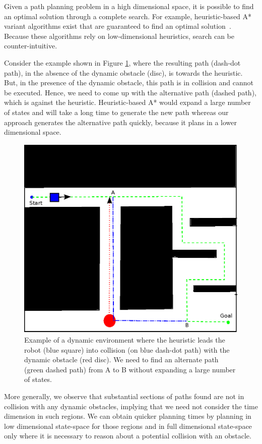 Given a path planning problem in a high dimensional space, it is possible to find an optimal solution through a complete search. For example, heuristic-based A* variant algorithms exist that are guaranteed to find an optimal solution~\cite{silver2005cooperative}. Because these algorithms rely on low-dimensional heuristics, search can be counter-intuitive.  

Consider the example shown in Figure \ref{fig:motivation}, where the resulting path (dash-dot path), in the absence of the dynamic obstacle (disc), is towards the heuristic. But, in the presence of the dynamic obstacle, this path is in collision and cannot be executed. Hence, we need to come up with the alternative path (dashed path), which is against the heuristic. Heuristic-based A* would expand a large number of states and will take a long time to generate the new path whereas our approach generates the alternative path quickly, because it plans in a lower dimensional space.

\begin{figure}[tb!]
\centering%
\includegraphics[width=0.7\linewidth]{Figures/intro.eps}%
\caption{Example of a dynamic environment where the heuristic leads the robot (blue square) into collision (on blue dash-dot path) with the dynamic obstacle (red disc). We need to find an alternate path (green dashed path) from A to B without expanding a large number of states.}%
\label{fig:motivation}
\end{figure}

More generally, we observe that substantial sections of paths found are not in collision with any dynamic obstacles, implying that we need not consider the time dimension in such regions. We can obtain quicker planning times by planning in low dimensional state-space for those regions and in full dimensional state-space only where it is necessary to reason about a potential collision with an obstacle. 

